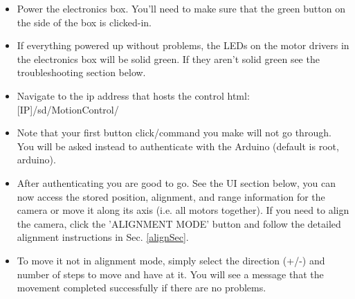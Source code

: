 \documentclass[11pt]{article}
\begin{document}
\begin{itemize}
	\item Power the electronics box.  You'll need to make sure that the green button on the side of the box is clicked-in.
	\item If everything powered up without problems, the LEDs on the motor drivers in the electronics box will be solid green. 
		If they aren't solid green see the troubleshooting section below.
	\item Navigate to the ip address that hosts the control html: [IP]/sd/MotionControl/
	\item Note that your first button click/command you make will not go through.  
		You will be asked instead to authenticate with the Arduino (default is root, arduino).
	\item After authenticating you are good to go.  
		See the UI section below, you can now access the stored position, alignment, and range information for the camera or move it along its axis (i.e. all motors together).  
		If you need to align the camera, click the 'ALIGNMENT MODE' button and follow the detailed alignment instructions in Sec. \ref{alignSec}.
	\item To move it not in alignment mode, simply select the direction (+/-) and number of steps to move and have at it.  
		You will see a message that the movement completed successfully if there are no problems.
\end{itemize}
\end{document}
